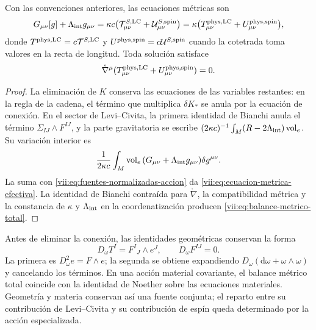 \begin{proposition}
\label{vii:prop:fuente-metrica-balance}
Con las convenciones anteriores, las ecuaciones métricas son
\begin{equation}
 G_{\mu\nu}[g]+\Lambda_{\rm int}g_{\mu\nu}
 =\kappa c\bigl(\mathcal T^{S,\rm LC}_{\mu\nu}
                    +\mathcal U^{S,\rm spin}_{\mu\nu}\bigr)
 =\kappa\bigl(T^{\rm phys,LC}_{\mu\nu}
                    +U^{\rm phys,spin}_{\mu\nu}\bigr),
 \label{vii:eq:ecuacion-metrica-efectiva}
\end{equation}
donde \(T^{\rm phys,LC}=c\mathcal T^{S,\rm LC}\) y
\(U^{\rm phys,spin}=c\mathcal U^{S,\rm spin}\) cuando la
cotetrada toma valores en la recta de longitud. Toda solución satisface
\begin{equation}
 \mathring\nabla^\mu
   (T^{\rm phys,LC}_{\mu\nu}+U^{\rm phys,spin}_{\mu\nu})=0.
 \label{vii:eq:balance-metrico-total}
\end{equation}
\end{proposition}
\begin{proof}
La eliminación de \(K\) conserva las ecuaciones de las variables
restantes: en la regla de la cadena, el término que multiplica
\(\delta K_*\) se anula por la ecuación de conexión. En el sector
de Levi--Civita, la primera identidad de Bianchi anula el término
\(\Sigma_{IJ}\wedge F^{IJ}\), y la parte gravitatoria se escribe
\((2\kappa c)^{-1}\int_M(R-2\Lambda_{\rm int})\operatorname{vol}_e\).
Su variación interior es
\[
 \frac1{2\kappa c}\int_M\operatorname{vol}_e\,
        (G_{\mu\nu}+\Lambda_{\rm int}g_{\mu\nu})\delta g^{\mu\nu}.
\]
La suma con \eqref{vii:eq:fuentes-normalizadas-accion} da
\eqref{vii:eq:ecuacion-metrica-efectiva}. La identidad de Bianchi
contraída para \(\mathring\nabla\), la compatibilidad métrica y
la constancia de \(\kappa\) y \(\Lambda_{\rm int}\) en la coordenatización
producen \eqref{vii:eq:balance-metrico-total}.
\end{proof}

Antes de eliminar la conexión, las identidades geométricas conservan
la forma
\begin{equation}
 D_\omega T^I=F^I{}_{J}\wedge e^J,\qquad D_\omega F^{IJ}=0.
 \label{vii:eq:bianchi-cartan}
\end{equation}
La primera es \(D_\omega^2e=F\wedge e\); la segunda se obtiene
expandiendo \(D_\omega(\mathrm d\omega+\omega\wedge\omega)\)
y cancelando los términos. En una acción material covariante, el
balance métrico total coincide con la identidad de Noether sobre las
ecuaciones materiales. Geometría y materia conservan así una fuente
conjunta; el reparto entre su contribución de Levi--Civita y su
contribución de espín queda determinado por la acción especializada.
